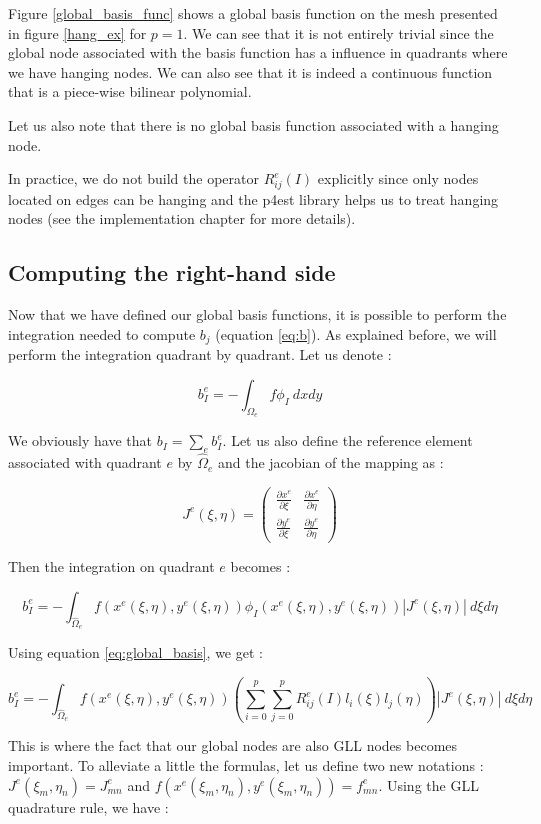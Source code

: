 Figure \ref{global_basis_func} shows a global basis function on the mesh presented in figure \ref{hang_ex} for $p=1$. We can see that it is not entirely trivial since the global node associated with the basis function has a influence in quadrants where we have hanging nodes. We can also see that it is indeed a continuous function that is a piece-wise bilinear polynomial. 

Let us also note that there is no global basis function associated with a hanging node. 

In practice, we do not build the operator $R^e_{ij}(I)$ explicitly since only nodes located on edges can be hanging and the p4est library helps us to treat hanging nodes (see the implementation chapter for more details).  

\subsection{Computing the right-hand side}

Now that we have defined our global basis functions, it is possible to perform the integration needed to compute $b_j$ (equation \ref{eq:b}). As explained before, we will perform the integration quadrant by quadrant. Let us denote : 

$$ b_I^e = -\int_{\Omega_e} f\phi_I\:dxdy$$

We obviously have that $b_I = \sum_e b_I^e$. Let us also define the reference element associated with quadrant $e$ by $\hat{\Omega}_e$ and the jacobian of the mapping as : 

$$ J^e (\xi,\eta) = \begin{pmatrix}
\frac{\partial x^e}{\partial \xi} & \frac{\partial x^e}{\partial \eta}\\
\frac{\partial y^e}{\partial \xi} & \frac{\partial y^e}{\partial \eta}
\end{pmatrix}$$

Then the integration on quadrant $e$ becomes : 

$$b_I^e = -\int_{\hat{\Omega}_e} f(x^e(\xi,\eta),y^e(\xi,\eta)) \phi_I(x^e(\xi,\eta),y^e(\xi,\eta)) |J^e(\xi,\eta)| \: d\xi d\eta$$

Using equation \ref{eq:global_basis}, we get : 

$$b_I^e = -\int_{\hat{\Omega}_e} f(x^e(\xi,\eta),y^e(\xi,\eta)) \left( \sum_{i=0}^p\sum_{j=0}^p R^e_{ij}(I) l_i(\xi)l_j(\eta) \right) |J^e(\xi,\eta)| \: d\xi d\eta $$

This is where the fact that our global nodes are also GLL nodes becomes important. To alleviate a little the formulas, let us define two new notations :  $J^e(\xi_m,\eta_n) = J^e_{mn}$ and $f(x^e(\xi_m,\eta_n),y^e(\xi_m,\eta_n)) = f^e_{mn}$. Using the GLL quadrature rule, we have : 

